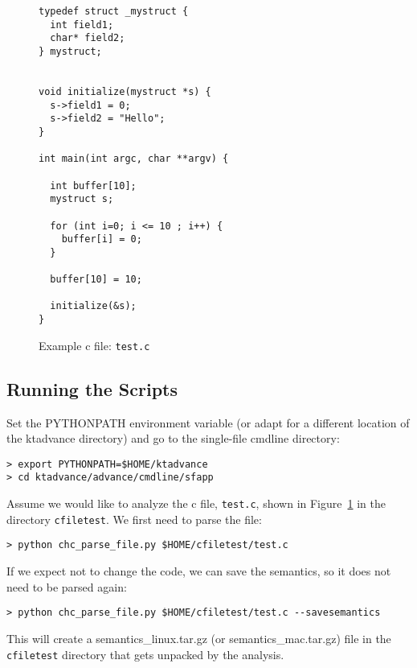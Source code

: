 \documentclass[11pt]{article}
\begin{document}
\begin{figure}
\centering
\begin{minipage}{8cm}
\begin{small}
\begin{lstlisting}[frame=single]
typedef struct _mystruct {
  int field1;
  char* field2;
} mystruct;


void initialize(mystruct *s) {
  s->field1 = 0;
  s->field2 = "Hello";
}

int main(int argc, char **argv) {

  int buffer[10];
  mystruct s;

  for (int i=0; i <= 10 ; i++) {
    buffer[i] = 0;
  }

  buffer[10] = 10;

  initialize(&s);
}
\end{lstlisting}
\end{small}
\end{minipage}
\caption{\label{fig:cfile} Example c file: {\tt test.c}}
\end{figure}

\subsection{Running the Scripts}
Set the PYTHONPATH environment variable (or adapt for a different location of the ktadvance
directory) and go to the single-file cmdline directory:
\begin{verbatim}
> export PYTHONPATH=$HOME/ktadvance
> cd ktadvance/advance/cmdline/sfapp
\end{verbatim}
Assume we would like to analyze the c file, {\tt test.c}, shown in 
Figure~\ref{fig:cfile} in the directory
{\tt cfiletest}. We first need to parse the file:
\begin{verbatim}
> python chc_parse_file.py $HOME/cfiletest/test.c
\end{verbatim}
If we expect not to change the code, we can save the semantics, so it does not need to
be parsed again:
\begin{verbatim}
> python chc_parse_file.py $HOME/cfiletest/test.c --savesemantics
\end{verbatim}
This will create a semantics\_linux.tar.gz (or semantics\_mac.tar.gz) file in the
{\tt cfiletest} directory that gets unpacked by the analysis.
\end{document}
